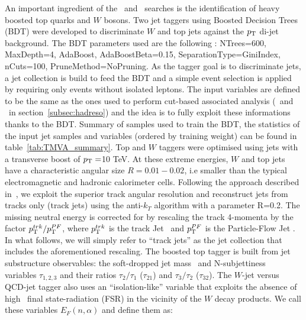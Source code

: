 An important ingredient of the \Zptt\ and \rsg\ searches is the identification of heavy boosted top quarks and $W$ bosons. Two jet taggers using Boosted Decision Trees (BDT) were developed to discriminate $W$ and top jets against the $p_{\text{T}}$ di-jet background.
\newline
The BDT parameters used are the following : NTrees=600, MaxDepth=4, AdaBoost, AdaBoostBeta=0.15, SeparationType=GiniIndex, nCuts=100, PruneMethod=NoPruning. As the tagger goal is to discriminate jets, a jet collection is build to feed the BDT and a simple event selection is applied by requiring only events without isolated leptons.
The input variables are defined to be the same as the ones used to perform cut-based associated analysis (\Zptt\ and \rsg\ in section~\ref{subsec:hadreso}) and the idea is to fully exploit these informations thanks to the BDT. Summary of samples used to train the BDT, the statistics of the input jet samples and variables (ordered by training weight) can be found in table~\ref{tab:TMVA_summary}.
\newline
Top and $W$ taggers were optimised using jets with a transverse boost of $p_{\text{T}}=$10 TeV. At these extreme energies, $W$ and top jets have a characteristic angular size $R=0.01-0.02$, i.e smaller than the typical electromagnetic and hadronic calorimeter cells. Following the approach described in~\cite{Larkoski:2015yqa}, we exploit the superior track angular resolution and reconstruct jets from tracks only (track jets) using the anti-$k_T$ algorithm with a parameter R=0.2. The missing neutral energy is corrected for by rescaling the track 4-momenta by the factor $p_{\text{T}}^{trk}/p_{\text{T}}^{PF}$, where $p_{\text{T}}^{trk}$ is the track Jet \pt\ and $p_{\text{T}}^{PF}$ is the Particle-Flow Jet \pT. In what follows, we will simply refer to ``track jets'' as the jet collection that includes the aforementioned rescaling.
\newline
The boosted top tagger is built from jet substructure observables: the soft-dropped jet mass~\cite{Larkoski:2014wba} and N-subjettiness~\cite{Thaler:2010tr} variables $\tau_{1,2,3}$ and their ratios $\tau_{2}/\tau_{1}$ ($\tau_{21}$) and $\tau_{3}/\tau_{2}$ ($\tau_{32}$). The $W$-jet versus QCD-jet tagger also uses an ``isolation-like'' variable that exploits the absence of high \pt\ final state-radiation (FSR) in the vicinity of the $W$ decay products. We call these variables $E_{F}(n,\alpha)$ and define them as:

